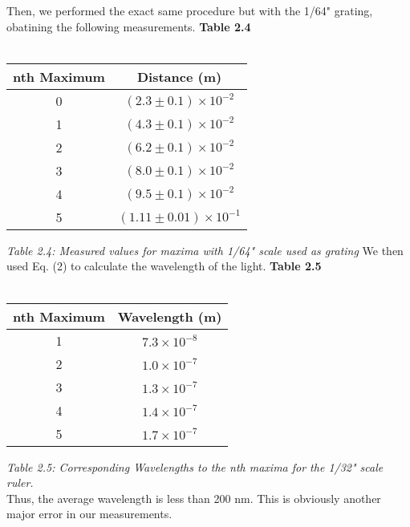 \documentclass[leqno]{article}
\begin{document}
\noindent Then, we performed the exact same procedure but with the 1/64" grating, obatining the following measurements.
\textbf{Table 2.4}\\\\
\begin{tabular}{|c|c|}
	\hline
	nth Maximum & Distance (m)\\
	\hline
	0 & $(2.3\pm0.1) \times 10^{-2}$\\
	\hline
	1 & $(4.3\pm0.1)\times 10^{-2}$\\ 
	\hline
	2 & $(6.2\pm0.1)\times 10^{-2}$\\ 
	\hline
	3 & $(8.0\pm0.1)\times 10^{-2}$\\ 
	\hline
	4 & $(9.5\pm0.1)\times 10^{-2}$\\ 
	\hline
	5 & $(1.11\pm0.01)\times 10^{-1}$\\
	\hline
\end{tabular}
\textit{\small Table 2.4: Measured values for maxima with 1/64" scale used as grating}
We then used Eq. (2) to calculate the wavelength of the light.
\textbf{Table 2.5}\\\\
\begin{tabular}{|c|c|}
	\hline
	nth Maximum & Wavelength (m)\\
	\hline
	1 & $7.3\times 10^{-8}$\\ 
	\hline
	2 & $1.0\times 10^{-7}$\\ 
	\hline
	3 & $1.3\times 10^{-7}$\\ 
	\hline
	4 & $1.4\times 10^{-7}$\\ 
	\hline
	5 & $1.7\times 10^{-7}$\\
	\hline
\end{tabular}
\textit{\small Table 2.5: Corresponding Wavelengths to the nth maxima for the 1/32" scale ruler.}\\
Thus, the average wavelength is less than 200 nm.  This is obviously another major error in our measurements.\\
\end{document}
